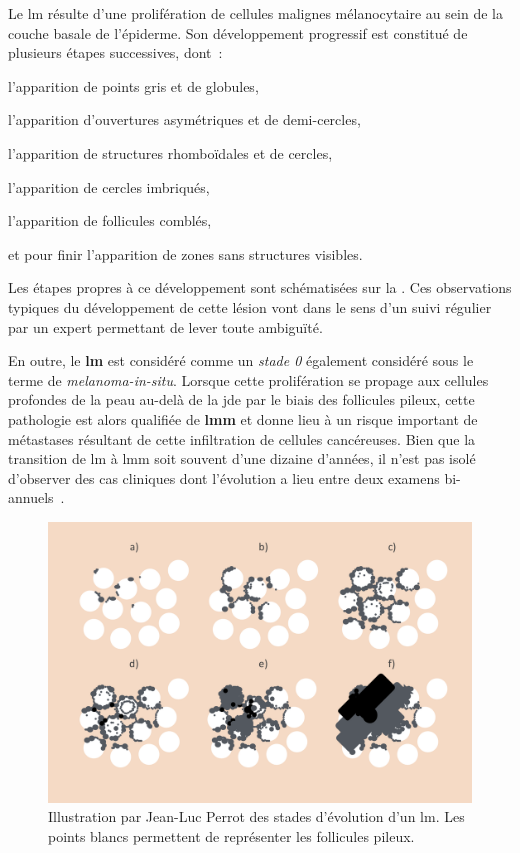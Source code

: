 Le \gls{lm} résulte d'une prolifération de cellules malignes mélanocytaire au sein de la couche basale de l'épiderme. Son développement progressif est constitué de plusieurs étapes successives, dont~:
\begin{inlinerate}[label=(\alph*)]
    \item l'apparition de points gris et de globules,
    \item l'apparition d'ouvertures asymétriques et de demi-cercles,
    \item l'apparition de structures rhomboïdales et de cercles,
    \item l'apparition de cercles imbriqués,
    \item l'apparition de follicules comblés,
    \item et pour finir l'apparition de zones sans structures visibles.
\end{inlinerate} 
Les étapes propres à ce développement sont schématisées sur la . Ces observations typiques du développement de cette lésion vont dans le sens d'un suivi régulier par un expert permettant de lever toute ambiguïté.\par

En outre, le \textbf{\gls{lm}} est considéré comme un \textit{stade 0} également considéré sous le terme de \textit{melanoma-in-situ}. Lorsque cette prolifération se propage aux cellules profondes de la peau au-delà de la \gls{jde} par le biais des follicules pileux, cette pathologie est alors qualifiée de \textbf{\gls{lmm}} et donne lieu à un risque important de métastases résultant de cette infiltration de cellules cancéreuses. Bien que la transition de \gls{lm} à \gls{lmm} soit souvent d'une dizaine d'années, il n'est pas isolé d'observer des cas cliniques dont l'évolution a lieu entre deux examens bi-annuels~\cite{Mckenna2006, LeGal2011}. 

\begin{figure}[H]
    \centering
    \includegraphics[width=\linewidth]{contents/chapter_1/resources/illustration_surface_progression.pdf}
    \caption{Illustration par Jean-Luc Perrot des stades d'évolution d'un \gls{lm}. Les points blancs permettent de représenter les follicules pileux.}
    \label{fig:illustration_surface_progression}
\end{figure}\par

